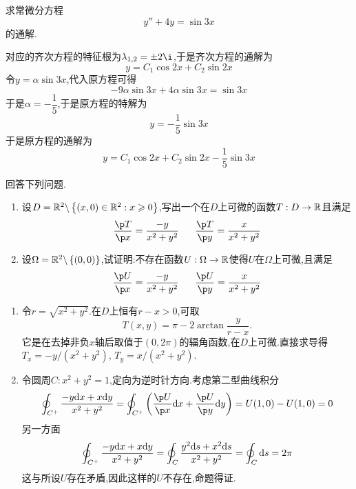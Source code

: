 \documentclass{ctexart}
\begin{document}
\begin{problem}[8.(10\songti{分})]
    求常微分方程
    \[y''+4y=\sin3x\]
    的通解.
\end{problem}
\begin{solution}
    对应的齐次方程的特征根为$\lambda_{1,2}=\pm2\i$,于是齐次方程的通解为
    \[y=C_1\cos2x+C_2\sin2x\]
    令$y=\alpha\sin3x$,代入原方程可得
    \[-9\alpha\sin3x+4\alpha\sin3x=\sin3x\]
    于是$\alpha=-\dfrac15$,于是原方程的特解为
    \[y=-\dfrac15\sin3x\]
    于是原方程的通解为
    \[y=C_1\cos2x+C_2\sin2x-\dfrac{1}{5}\sin3x\]
\end{solution}
\begin{problem}[9.(10\songti{分})]
    回答下列问题.
    \begin{enumerate}[label=\tbf{(\arabic*)}]
        \item 设$D=\mathbb{R}^2\backslash\left\{(x,0)\in\mathbb{R}^2:x\geqslant 0\right\}$,写出一个在$D$上可微的函数$T:D\to\mathbb{R}$且满足
            \[\dfrac{\p T}{\p x}=\dfrac{-y}{x^2+y^2}\ \ \ \ \ \dfrac{\p T}{\p y}=\dfrac{x}{x^2+y^2}\]
        \item 设$\Omega=\mathbb{R}^2\backslash\left\{(0,0)\right\}$,试证明:不存在函数$U:\Omega\to\mathbb{R}$使得$U$在$\Omega$上可微,且满足
            \[\dfrac{\p U}{\p x}=\dfrac{-y}{x^2+y^2}\ \ \ \ \ \dfrac{\p U}{\p y}=\dfrac{x}{x^2+y^2}\]
    \end{enumerate}

\end{problem}
\begin{solution}
    \begin{enumerate}[label=\tbf{(\arabic*)}]
        \item 令$r=\sqrt{x^2+y^2}$.在$D$上恒有$r-x>0$,可取
            \[T(x,y)=\pi-2\arctan\dfrac{y}{r-x}.\]
            它是在去掉非负$x$轴后取值于$(0,2\pi)$的辐角函数,在$D$上可微.直接求导得$T_x=-y/(x^2+y^2)$, $T_y=x/(x^2+y^2)$.

        \item 令圆周$C:x^2+y^2=1$,定向为逆时针方向.考虑第二型曲线积分
            \[\oint_{C^+}\dfrac{-y\dx+x\di y}{x^2+y^2}=\oint_{C^+}\left(\dfrac{\p U}{\p x}\dx+\dfrac{\p U}{\p y}\di y\right)=U(1,0)-U(1,0)=0\]
            另一方面
            \[\oint_{C^+}\dfrac{-y\mathrm{d} x+x\mathrm{d} y}{x^2+y^2}=\oint_{C}\dfrac{y^2\mathrm{d} s+x^2\mathrm{d} s}{x^2+y^2}=\oint_{C}\mathrm{d} s=2\pi\]
            这与所设$U$存在矛盾,因此这样的$U$不存在,命题得证.
    \end{enumerate}
\end{solution}
\end{document}
